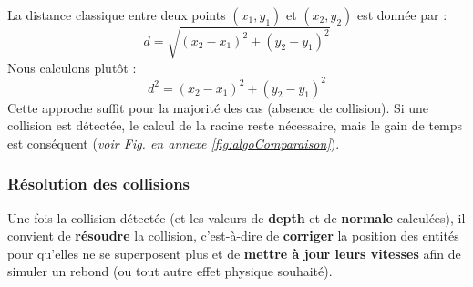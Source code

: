 \documentclass[a4paper,11pt]{article}
\begin{document}
La distance classique entre deux points \((x_1, y_1)\) et \((x_2, y_2)\) est donnée par :
\[
d = \sqrt{(x_2 - x_1)^2 + (y_2 - y_1)^2}
\]
Nous calculons plutôt :
\[
d^2 = (x_2 - x_1)^2 + (y_2 - y_1)^2
\]
Cette approche suffit pour la majorité des cas (absence de collision). Si une collision est détectée, le calcul de la racine reste nécessaire, mais le gain de temps est conséquent (\textit{voir Fig. en annexe \ref{fig:algoComparaison}}).

\subsubsection{Résolution des collisions}
\label{sec:resolution_collisions}
Une fois la collision détectée (et les valeurs de \textbf{depth} et de \textbf{normale} calculées), il convient de \textbf{résoudre} la collision, c’est-à-dire de \textbf{corriger} la position des entités pour qu’elles ne se superposent plus et de \textbf{mettre à jour leurs vitesses} afin de simuler un rebond (ou tout autre effet physique souhaité).
\end{document}
